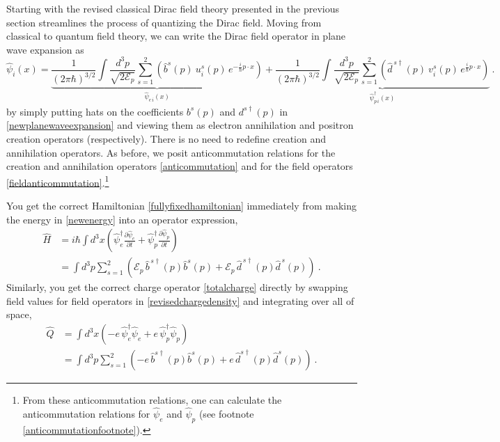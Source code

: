 \documentclass[12pt,secnumarabic,amsmath,amssymb,balancelastpage,nofootinbib]{article}
\begin{document}
Starting with the revised classical Dirac field theory presented in the previous section streamlines the process of quantizing the Dirac field.  Moving from classical to quantum field theory, we can write the Dirac field operator in plane wave expansion as
\begin{equation}
\widehat{\psi}_i (x) = \underbrace{\frac{1}{(2\pi\hbar)^{3/2}}\int{ \frac{d^3 p}{\sqrt{2 \mathcal{E}_p}} \sum_{s=1}^2 \left(\widehat{b}^s (p) \: u_i^s (p) \, e^{-\frac{i}{\hbar} p \cdot x}\right)}}_{\mbox{$\widehat{\psi}_{e\,i}(x)$}}
+\underbrace{\frac{1}{(2\pi\hbar)^{3/2}}\int{ \frac{d^3 p}{\sqrt{2 \mathcal{E}_p}} \sum_{s=1}^2 \left(\widehat{d}^{\,s\dagger} (p) \: v_i^s (p) \,  e^{\frac{i}{\hbar} p \cdot x}\right)}}_{\mbox{$\widehat{\psi}^\dagger_{p\,i}(x)$}}
\ .
\end{equation}
by simply putting hats on the coefficients $b^s (p)$ and $d^{s\dagger} (p)$ in \eqref{newplanewaveexpansion} and viewing them as electron annihilation and positron creation operators (respectively).  There is no need to redefine creation and annihilation operators.  As before, we posit anticommutation relations for the creation and annihilation operators \eqref{anticommutation} and for the field operators \eqref{fieldanticommutation}.\footnote{From these anticommutation relations, one can calculate the anticommutation relations for $\widehat{\psi}_{e}$ and $\widehat{\psi}_{p}$ (see footnote \ref{anticommutationfootnote}).}


You get the correct Hamiltonian \eqref{fullyfixedhamiltonian} immediately from making the energy in \eqref{newenergy} into an operator expression,
\begin{align}
\widehat{H}&=i \hbar \int{d^3 x \left(\widehat{\psi}_e^{\dagger}\frac{\partial \widehat{\psi}_e}{\partial t} + \widehat{\psi}_p^{\dagger}\frac{\partial \widehat{\psi}_p}{\partial t}\right)}
\nonumber
\\
&=\int{d^3 p \sum_{s=1}^2  \left(\mathcal{E}_p\,\widehat{b}^{\, s\dagger}(p)\widehat{b}^{s}(p)+\mathcal{E}_p\,\widehat{d}^{\, s\dagger}(p)\widehat{d}^{\,s}(p)\right)}
\ .
\end{align}
Similarly, you get the correct charge operator \eqref{totalcharge} directly by swapping field values for field operators in \eqref{revisedchargedensity} and integrating over all of space,
\begin{align}
\widehat{Q}&= \int{d^3 x \left(-e\, \widehat{\psi}_e^\dagger\widehat{\psi}_e  + e\, \widehat{\psi}_p^\dagger\widehat{\psi}_p\right)}
\nonumber
\\
&=\int{d^3 p \sum_{s=1}^2  \left(-e\,\widehat{b}^{s\dagger}(p)\widehat{b}^s(p)+e\,\widehat{d}^{s\dagger}(p)\widehat{d}^{s}(p)\right)}
\ .
\end{align}
\end{document}
